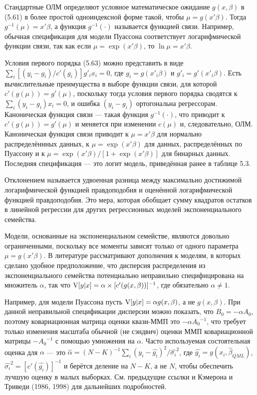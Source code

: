 Стандартные ОЛМ определяют условное математическое ожидание $g(x,\beta)$ в (5.61) в более простой одноиндексной форме такой, чтобы $\mu=g(x'\beta)$. Тогда  $g^{-1}(\mu)=x'\beta$, а функция $g^{-1}(\cdot)$ называется функцией связи. Например, обычная спецификация для модели Пуассона соответствует логарифмической  функции связи, так как если $\mu=\exp(x'\beta)$, то $\ln \mu =x'\beta$.

Условия первого порядка (5.63) можно представить в виде $\sum_i [(y_i-g_i)/c'(g_i)]g'_i x_i=0$, где $g_i=g(x'_i\beta)$ и $g'_i=g'(x'_i\beta)$. Есть вычислительные преимущества в выборе функции связи, для которой $c'(g(\mu))=g'(\mu)$, поскольку тогда условия первого порядка сводятся к
$\sum_i (y_i-g_i)x_i=0$, и ошибка $(y_i-g_i)$ ортогональна регрессорам. Каноническая функция связи --- такая функция $g^{-1}(\cdot)$, что приводит к $c'(g(\mu))=g'(\mu)$ и меняется при изменении $c(\mu)$ и, следовательно, ОЛМ. Каноническая функция связи приводит к $\mu=x'\beta$ для нормально распределённных данных, к $\mu=\exp(x'\beta)$ для данных, распределённых по Пуассону и к $\mu=\exp(x'\beta)/[1+\exp(x'\beta)]$ для бинарных данных. Последняя спецификация --- это логит модель, приведённая ранее в таблице 5.3.

Отклонением называется удвоенная разница между максимально достижимой логарифмической функцией правдоподобия и оценённой логарифмической функцией правдоподобия. Это мера, которая обобщает сумму квадратов остатков в линейной регрессии для других регрессионных моделей экспоненциального семейства.

Модели, основанные на экспоненциальном семействе, являются довольно ограниченными, поскольку все моменты зависят только от одного параметра $\mu=g(x'\beta)$. В литературе рассматривают дополнения к моделям, в которых сделано  удобное предположение, что дисперсия распределения из экспоненциального семейства потенциально неправильно специфицирована на множитель $\alpha$, так что $\mathrm{V}[y|x]=\alpha \times [c'(g(x,\beta))]^{-1}$, где обязательно $\alpha \not = 1$.

Например, для модели Пуассона пусть $\mathrm{V}[y|x]=\alpha g(x,\beta)$, а не $g(x,\beta)$. При данной неправильной спецификации дисперсии можно показать, что $B_0=-\alpha A_0$, поэтому ковариационная матрица оценки квази-ММП это $-\alpha {A_0}^{-1}$, что требует только изменения масштаба обычной (не сэндвич) оценки ММП ковариационной матрицы $-{A_0}^{-1}$ с помощью умножения на $\alpha$. Часто используемая состоятельная оценка для $\alpha$ --- это $\hat{\alpha}=(N-K)^{-1} \sum_i(y_i-\hat{g_i})^{2}/ {\hat{\sigma_i}}^2$, где $\hat{g_i}=g(x_i,\hat{\beta}_{QML})$, ${\hat{\sigma_i}}^2=[c'(\hat{g_i})]^{-1}$ и берётся деление на $ N-K$, а не $N$, чтобы обеспечить лучшую оценку в малых выборках. См. предыдущие ссылки и Кэмерона и Триведи (1986, 1998) для дальнейших подробностей.

